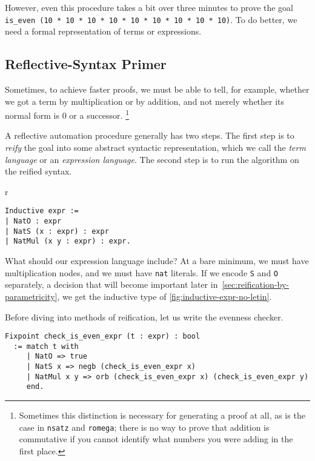 However, even this procedure takes a bit over three minutes to prove the goal \texttt{is_even (10 * 10 * 10 * 10 * 10 * 10 * 10 * 10 * 10)}.
To do better, we need a formal representation of terms or expressions.

\subsection{Reflective-Syntax Primer}
Sometimes, to achieve faster proofs, we must be able to tell, for example, whether we got a term by multiplication or by addition, and not merely whether its normal form is 0 or a successor.%
\footnote{%
  Sometimes this distinction is necessary for generating a proof at all, as is the case in \texttt{nsatz} and \texttt{romega}; there is no way to prove that addition is commutative if you cannot identify what numbers you were adding in the first place.%
}

A reflective automation procedure generally has two steps.
The first step is to \emph{reify} the goal into some abstract syntactic representation, which we call the \emph{term language} or an \emph{expression language}.
The second step is to run the algorithm on the reified syntax.

\begin{wrapfigure}[7]{r}{}
\begin{verbatim}
Inductive expr :=
| NatO : expr
| NatS (x : expr) : expr
| NatMul (x y : expr) : expr.
\end{verbatim}
\caption{Simple Expressions}\label{fig:inductive-expr-no-letin}
\end{wrapfigure}
What should our expression language include?
At a bare minimum, we must have multiplication nodes, and we must have \texttt{nat} literals.
If we encode \texttt{S} and \texttt{O} separately, a decision that will become important later in~\autoref{sec:reification-by-parametricity}, we get the inductive type of \autoref{fig:inductive-expr-no-letin}.

Before diving into methods of reification, let us write the evenness checker.
\begin{verbatim}
Fixpoint check_is_even_expr (t : expr) : bool
  := match t with
     | NatO => true
     | NatS x => negb (check_is_even_expr x)
     | NatMul x y => orb (check_is_even_expr x) (check_is_even_expr y)
     end.
\end{verbatim}

